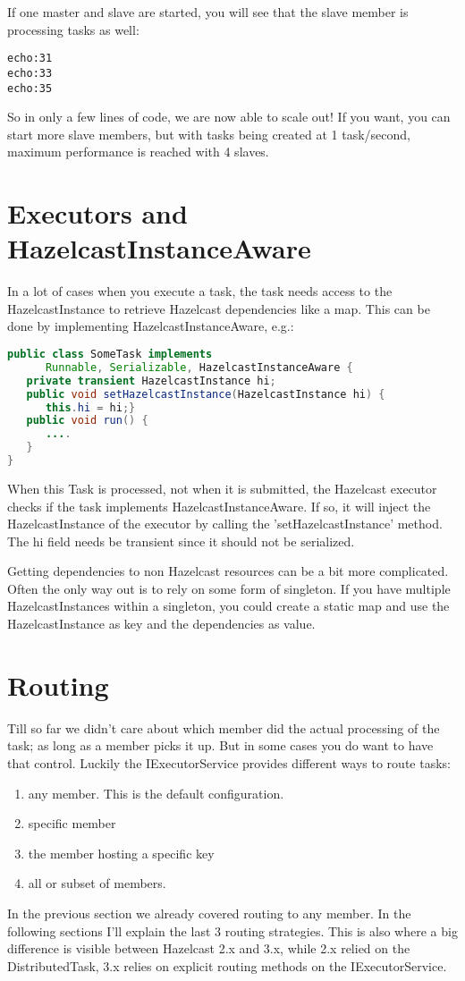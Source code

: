 If one master and slave are started, you will see that the slave member is processing tasks as well:
\begin{lstlisting}
echo:31
echo:33
echo:35	
\end{lstlisting}
So in only a few lines of code, we are now able to scale out! If you want, you can start more slave members, but with tasks being created at 1 task/second, maximum performance is reached with 4 slaves.

\section{Executors and HazelcastInstanceAware}
In a lot of cases when you execute a task, the task needs access to the HazelcastInstance to retrieve Hazelcast dependencies like a map. This can be done by implementing HazelcastInstanceAware, e.g.:
\begin{lstlisting}[language=java]
public class SomeTask implements
      Runnable, Serializable, HazelcastInstanceAware {
   private transient HazelcastInstance hi;
   public void setHazelcastInstance(HazelcastInstance hi) {
      this.hi = hi;}
   public void run() {
      ....
   }
}
\end{lstlisting}
When this Task is processed, not when it is submitted, the Hazelcast executor checks if the task implements HazelcastInstanceAware. If so, it will inject the HazelcastInstance of the executor by calling the 'setHazelcastInstance' method. The hi field needs be transient since it should not be serialized.

Getting dependencies to non Hazelcast resources can be a bit more complicated. Often the only way out is to rely on some form of singleton. If you have multiple HazelcastInstances within a singleton, you could create a static map and use the HazelcastInstance as key and the dependencies as value.

\section{Routing}
Till so far we didn't care about which member did the actual processing of the task; as long as a member picks it up. But in some cases you do want to have that control. Luckily the IExecutorService provides different ways to route tasks:
\begin{enumerate}
\item any member. This is the default configuration.
\item specific member
\item the member hosting a specific key
\item all or subset of members.
\end{enumerate}
In the previous section we already covered routing to any member. In the following sections I'll explain the last 3 routing strategies. This is also where a big difference is visible between Hazelcast 2.x and 3.x, while 2.x relied on the DistributedTask, 3.x relies on explicit routing methods on the IExecutorService. 

